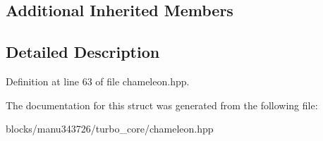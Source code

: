 \subsection*{Additional Inherited Members}


\subsection{Detailed Description}


Definition at line 63 of file chameleon.\+hpp.



The documentation for this struct was generated from the following file\+:\begin{DoxyCompactItemize}
\item 
blocks/manu343726/turbo\+\_\+core/chameleon.\+hpp\end{DoxyCompactItemize}
